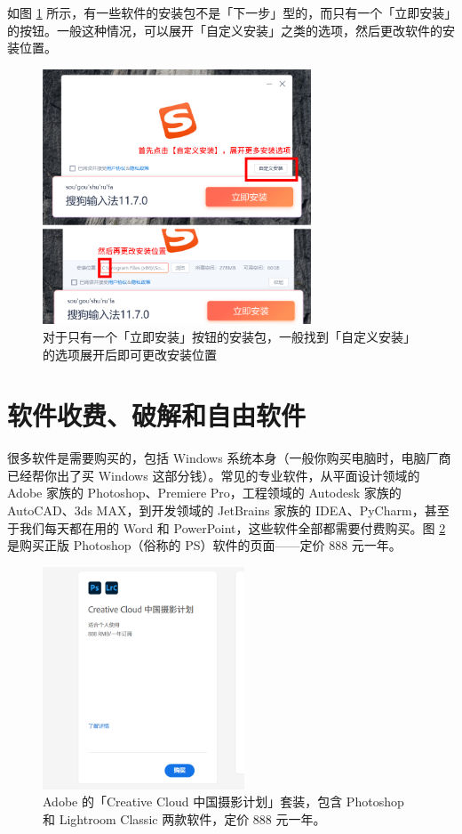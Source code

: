 如图 \ref{sogou-install} 所示，有一些软件的安装包不是「下一步」型的，而只有一个「立即安装」的按钮。一般这种情况，可以展开「自定义安装」之类的选项，然后更改软件的安装位置。

\begin{figure}[htb!]
  \centering
  \includegraphics[width=8cm]{assets/Sogou_change_directory.png}
  \caption{对于只有一个「立即安装」按钮的安装包，一般找到「自定义安装」的选项展开后即可更改安装位置}
  \label{sogou-install}
\end{figure}

\section{软件收费、破解和自由软件}

很多软件是需要购买的，包括 Windows 系统本身（一般你购买电脑时，电脑厂商已经帮你出了买 Windows 这部分钱）。常见的专业软件，从平面设计领域的 Adobe 家族的 Photoshop、Premiere Pro，工程领域的 Autodesk 家族的 AutoCAD、3ds MAX，到开发领域的 JetBrains 家族的 IDEA、PyCharm，甚至于我们每天都在用的 Word 和 PowerPoint，这些软件全部都需要付费购买。图 \ref{buy-adobe} 是购买正版 Photoshop（俗称的 PS）软件的页面——定价 888 元一年。

\begin{figure}[htb!]
  \centering
  \includegraphics[width=6cm]{assets/Adobe.png}
  \caption{Adobe 的「Creative Cloud 中国摄影计划」套装，包含 Photoshop 和 Lightroom Classic 两款软件，定价 888 元一年。}
  \label{buy-adobe}
\end{figure}


